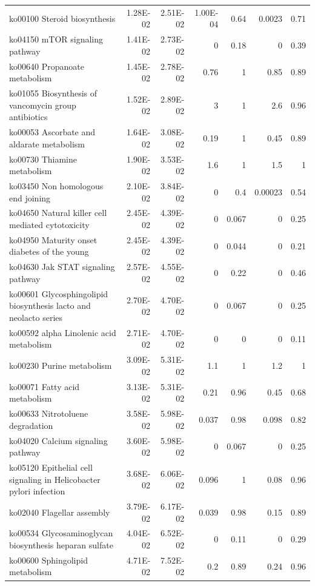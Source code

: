 {\begin{longtable}{ | l | r | r | r | r | r | r  | }
		ko00100 Steroid biosynthesis & 1.28E-02 & 2.51E-02 & 1.00E-04 & 0.64 & 0.0023 & 0.71 \\ 
		ko04150 mTOR signaling pathway & 1.41E-02 & 2.73E-02 & 0 & 0.18 & 0 & 0.39 \\ 
		ko00640 Propanoate metabolism & 1.45E-02 & 2.78E-02 & 0.76 & 1 & 0.85 & 0.89 \\ 
		ko01055 Biosynthesis of vancomycin group antibiotics & 1.52E-02 & 2.89E-02 & 3 & 1 & 2.6 & 0.96 \\ 
		ko00053 Ascorbate and aldarate metabolism & 1.64E-02 & 3.08E-02 & 0.19 & 1 & 0.45 & 0.89 \\ 
		ko00730 Thiamine metabolism & 1.90E-02 & 3.53E-02 & 1.6 & 1 & 1.5 & 1 \\ 
		ko03450 Non homologous end joining & 2.10E-02 & 3.84E-02 & 0 & 0.4 & 0.00023 & 0.54 \\ 
		ko04650 Natural killer cell mediated cytotoxicity & 2.45E-02 & 4.39E-02 & 0 & 0.067 & 0 & 0.25 \\ 
		ko04950 Maturity onset diabetes of the young & 2.45E-02 & 4.39E-02 & 0 & 0.044 & 0 & 0.21 \\ 
		ko04630 Jak STAT signaling pathway & 2.57E-02 & 4.55E-02 & 0 & 0.22 & 0 & 0.46 \\ 
		ko00601 Glycosphingolipid biosynthesis lacto and neolacto series & 2.70E-02 & 4.70E-02 & 0 & 0.067 & 0 & 0.25 \\ 
		ko00592 alpha Linolenic acid metabolism & 2.71E-02 & 4.70E-02 & 0 & 0 & 0 & 0.11 \\ 
		ko00230 Purine metabolism & 3.09E-02 & 5.31E-02 & 1.1 & 1 & 1.2 & 1 \\ 
		ko00071 Fatty acid metabolism & 3.13E-02 & 5.31E-02 & 0.21 & 0.96 & 0.45 & 0.68 \\ 
		ko00633 Nitrotoluene degradation & 3.58E-02 & 5.98E-02 & 0.037 & 0.98 & 0.098 & 0.82 \\ 
		ko04020 Calcium signaling pathway & 3.60E-02 & 5.98E-02 & 0 & 0.067 & 0 & 0.25 \\ 
		ko05120 Epithelial cell signaling in Helicobacter pylori infection & 3.68E-02 & 6.06E-02 & 0.096 & 1 & 0.08 & 0.96 \\ 
		ko02040 Flagellar assembly & 3.79E-02 & 6.17E-02 & 0.039 & 0.98 & 0.15 & 0.89 \\ 
		ko00534 Glycosaminoglycan biosynthesis heparan sulfate & 4.04E-02 & 6.52E-02 & 0 & 0.11 & 0 & 0.29 \\ 
		ko00600 Sphingolipid metabolism & 4.71E-02 & 7.52E-02 & 0.2 & 0.89 & 0.24 & 0.96 \\ 

\end{longtable}}

